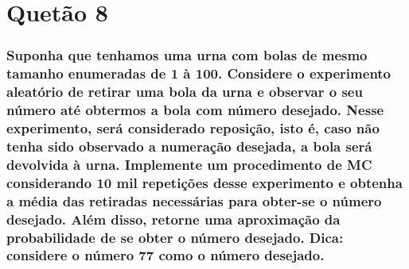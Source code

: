 \documentclass[
]{article}
\begin{document}
\section{Quetão 8}\label{quetuxe3o-8}

\subsubsection{Suponha que tenhamos uma urna com bolas de mesmo tamanho
enumeradas de 1 à 100. Considere o experimento aleatório de retirar uma
bola da urna e observar o seu número até obtermos a bola com número
desejado. Nesse experimento, será considerado reposição, isto é, caso
não tenha sido observado a numeração desejada, a bola será devolvida à
urna. Implemente um procedimento de MC considerando 10 mil repetições
desse experimento e obtenha a média das retiradas necessárias para
obter-se o número desejado. Além disso, retorne uma aproximação da
probabilidade de se obter o número desejado. Dica: considere o número 77
como o número
desejado.}\label{suponha-que-tenhamos-uma-urna-com-bolas-de-mesmo-tamanho-enumeradas-de-1-uxe0-100.-considere-o-experimento-aleatuxf3rio-de-retirar-uma-bola-da-urna-e-observar-o-seu-nuxfamero-atuxe9-obtermos-a-bola-com-nuxfamero-desejado.-nesse-experimento-seruxe1-considerado-reposiuxe7uxe3o-isto-uxe9-caso-nuxe3o-tenha-sido-observado-a-numerauxe7uxe3o-desejada-a-bola-seruxe1-devolvida-uxe0-urna.-implemente-um-procedimento-de-mc-considerando-10-mil-repetiuxe7uxf5es-desse-experimento-e-obtenha-a-muxe9dia-das-retiradas-necessuxe1rias-para-obter-se-o-nuxfamero-desejado.-aluxe9m-disso-retorne-uma-aproximauxe7uxe3o-da-probabilidade-de-se-obter-o-nuxfamero-desejado.-dica-considere-o-nuxfamero-77-como-o-nuxfamero-desejado.}
\end{document}
